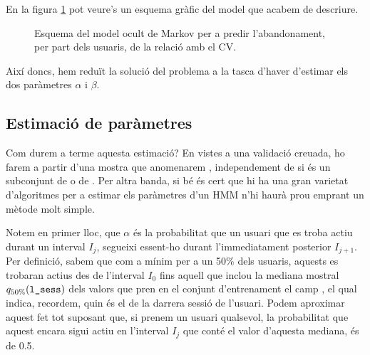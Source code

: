 \documentclass[
	a4paper,
	twoside,
	justified
]{tufte-book}
\begin{document}
En la figura \ref{dia:simple_hmm} pot veure's un esquema gràfic del model que acabem de descriure.

\begin{figure}
\begin{center}
\end{center}
\caption{
	\label{dia:simple_hmm}
	Esquema del model ocult de Markov per a predir l'abandonament, per part dels usuaris, de la relació amb el CV. 
}
\end{figure}

Així doncs, hem reduït la solució del problema a la tasca d'haver d'estimar els dos paràmetres $\alpha$ i $\beta$. 

\subsection{Estimació de paràmetres}

Com durem a terme aquesta estimació? En vistes a una validació creuada, ho farem a partir d'una mostra que anomenarem , independement de si és un subconjunt de  o de . Per altra banda, si bé és cert que hi ha una gran varietat d'algoritmes per a estimar els paràmetres d'un HMM n'hi haurà prou emprant un mètode molt simple. 

Notem en primer lloc, que $\alpha$ és la probabilitat que un usuari que es troba actiu durant un interval $I_j$, segueixi essent-ho durant l'immediatament posterior $I_{j+1}$. Per definició, sabem que com a mínim per a un 50\% dels usuaris, aquests es trobaran actius des de l'interval $I_0$ fins aquell que inclou la mediana mostral $q_{50\%}(\texttt{l\_sess})$ dels valors que pren en el conjunt d'entrenament  el camp , el qual indica, recordem, quin és el  de la darrera sessió de l'usuari. Podem aproximar aquest fet tot suposant que, si prenem un usuari qualsevol, la probabilitat que aquest encara sigui actiu en l'interval $I_j$ que conté el valor d'aquesta mediana, és de 0.5.   
\end{document}
